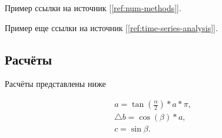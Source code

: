 Пример ссылки на источник [\ref{ref:num-methods}].

Пример еще ссылки на источник [\ref{ref:time-series-analysis}].

\subsection{Расчёты}

Расчёты представлены ниже

\begin{gather}
	a = \tan(\frac{\alpha}{2})*a*\pi, \\
	\bigtriangleup b = \cos(\beta)*a, \\
	c = \sin{\beta}.
\end{gather}


\examplecommand
